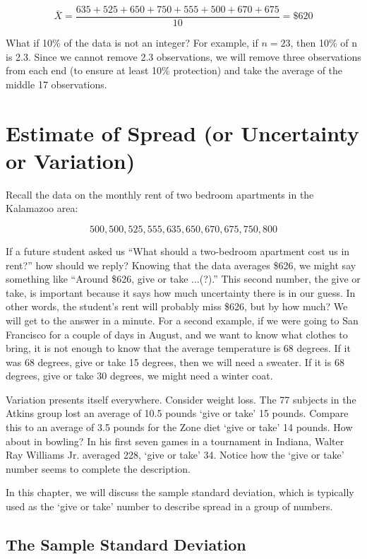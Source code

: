 \documentclass[11pt, chapterprefix=true]{scrbook}\usepackage[]{graphicx}\usepackage[]{color}
\begin{document}
$$\bar{X} = \frac{635+525+650+750+555+500+670+675}{10} = \$620$$

What if 10\% of the data is not an integer?  For example, if $n = 23$, then 10\% of n is 2.3.  Since we cannot remove 2.3 observations, we will remove three observations from each end (to ensure at least 10\% protection) and take the average of the middle 17 observations.


\section{Estimate of Spread (or Uncertainty or Variation)}

Recall the data on the monthly rent of two bedroom apartments in the Kalamazoo area:

$$ 500, 500, 525, 555, 635, 650, 670, 675, 750, 800 $$

If a future student asked us ``What should a two-bedroom apartment cost us in rent?'' how should we reply? Knowing that the data averages \$626, we might say something like ``Around \$626, give or take $\dots$(?).''   This second number, the give or take, is important because it says how much uncertainty there is in our guess.  In other words, the student's rent will probably miss \$626, but by how much?   We will get to the answer in a minute.   
For a second example, if we were going to San Francisco for a couple of days in August, and we want to know what clothes to bring, it is not enough to know that the average temperature is 68 degrees.  If it was 68 degrees, give or take 15 degrees, then we will need a sweater.  If it is 68 degrees, give or take 30 degrees, we might need a winter coat.

Variation presents itself everywhere.  Consider weight loss.  The 77 subjects in the Atkins group lost an average of 10.5 pounds `give or take' 15 pounds.  Compare this to an average of 3.5 pounds for the Zone diet `give or take' 14 pounds. How about in bowling?  In his first seven games in a tournament in Indiana, Walter Ray Williams Jr. averaged 228, `give or take' 34.   Notice how the `give or take' number seems to complete the description.

In this chapter, we will discuss the sample standard deviation, which is typically used as the ‘give or take’ number to describe spread in a group of numbers.

\subsection{The Sample Standard Deviation}
\end{document}
